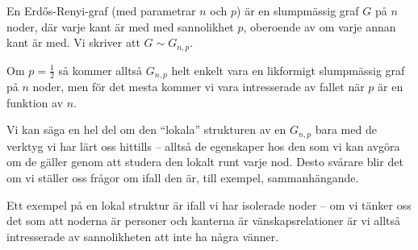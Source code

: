\documentclass[nobib]{tufte-handout}
\begin{document}
\begin{definition}
    En Erd\H{o}s-Renyi-graf (med parametrar $n$ och $p$) är en slumpmässig graf $G$ på $n$ noder, där varje kant är med med sannolikhet $p$, oberoende av om varje annan kant är med. Vi skriver att $G \sim G_{n,p}$.

    Om $p = \frac{1}{2}$ så kommer alltså $G_{n,p}$ helt enkelt vara en likformigt slumpmässig graf på $n$ noder, men för det mesta kommer vi vara intresserade av fallet när $p$ är en funktion av $n$.
\end{definition}

Vi kan säga en hel del om den ``lokala'' strukturen av en $G_{n,p}$ bara med de verktyg vi har lärt oss hittills -- alltså de egenskaper hos den som vi kan avgöra om de gäller genom att studera den lokalt runt varje nod. Desto svårare blir det om vi ställer oss frågor om ifall den är, till exempel, sammanhängande.

Ett exempel på en lokal struktur är ifall vi har isolerade noder -- om vi tänker oss det som att noderna är personer och kanterna är vänskapsrelationer är vi alltså intresserade av sannolikheten att inte ha några vänner.
\end{document}

